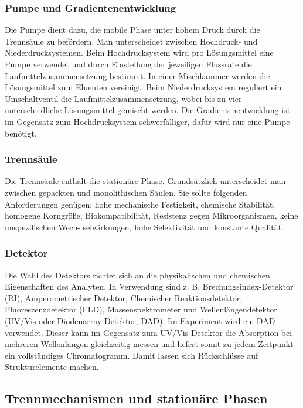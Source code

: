     \subsubsection{Pumpe und Gradientenentwicklung} \label{sec:Pumpe}
     
       Die Pumpe dient dazu, die mobile Phase unter hohem Druck durch die Trennsäule zu befördern. Man unterscheidet zwischen Hochdruck- und Niederdrucksystemen. Beim Hochdrucksystem wird pro Lösungsmittel eine Pumpe verwendet und durch Einstellung der jeweiligen Flussrate die Laufmittelzusammensetzung bestimmt. In einer Mischkammer werden die Lösungsmittel zum Eluenten vereinigt. Beim Niederdrucksystem reguliert ein Umschaltventil die Laufmittelzusammensetzung, wobei bis zu vier unterschiedliche Lösungsmittel gemischt werden. Die Gradientenentwicklung ist im Gegensatz zum Hochdrucksystem schwerfälliger, dafür wird nur eine Pumpe benötigt. \citep{SkriptHPLC}
       
     \subsubsection{Trennsäule}
       
       Die Trennsäule enthält die stationäre Phase. Grundsätzlich unterscheidet man zwischen gepackten und monolithischen Säulen. Sie sollte folgenden Anforderungen genügen: hohe mechanische Festigkeit, chemische Stabilität, homogene Korngröße,
Biokompatibilität, Resistenz gegen Mikroorganismen, keine unspezifischen Wech-
selwirkungen, hohe Selektivität und konstante Qualität. \citep{SkriptHPLC}

     \subsubsection{Detektor}
     
       Die Wahl des Detektors richtet sich an die physikalischen und chemischen Eigenschaften des Analyten. In Verwendung sind z. B. Brechungsindex-Detektor (RI), Amperometrischer Detektor, Chemischer Reaktionsdetektor, Fluoreszenzdetektor (FLD), Massenspektrometer und Wellenlängendetektor (UV/Vis oder Diodenarray-Detektor, DAD). Im Experiment wird ein DAD verwendet. Dieser kann im Gegensatz zum UV/Vis Detektor die Absorption bei mehreren Wellenlängen gleichzeitig messen und liefert somit zu jedem Zeitpunkt ein vollständiges Chromatogramm. Damit lassen sich Rückschlüsse auf Strukturelemente machen. \citep[S. 158]{Taschenatlas}
     
  \subsection{Trennmechanismen und stationäre Phasen}
    
